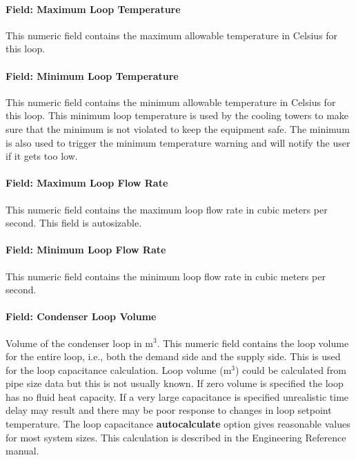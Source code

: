 \paragraph{Field: Maximum Loop Temperature}\label{field-maximum-loop-temperature-1}

This numeric field contains the maximum allowable temperature in Celsius for this loop.

\paragraph{Field: Minimum Loop Temperature}\label{field-minimum-loop-temperature-1}

This numeric field contains the minimum allowable temperature in Celsius for this loop. This minimum loop temperature is used by the cooling towers to make sure that the minimum is not violated to keep the equipment safe. The minimum is also used to trigger the minimum temperature warning and will notify the user if it gets too low.

\paragraph{Field: Maximum Loop Flow Rate}\label{field-maximum-loop-flow-rate-1}

This numeric field contains the maximum loop flow rate in cubic meters per second. This field is autosizable.

\paragraph{Field: Minimum Loop Flow Rate}\label{field-minimum-loop-flow-rate-1}

This numeric field contains the minimum loop flow rate in cubic meters per second.

\paragraph{Field: Condenser Loop Volume}\label{field-condenser-loop-volume}

Volume of the condenser loop in m\(^{3}\). This numeric field contains the loop volume for the entire loop, i.e., both the demand side and the supply side. This is used for the loop capacitance calculation. Loop volume (m\(^{3}\)) could be calculated from pipe size data but this is not usually known. If zero volume is specified the loop has no fluid heat capacity. If a very large capacitance is specified unrealistic time delay may result and there may be poor response to changes in loop setpoint temperature. The loop capacitance \textbf{autocalculate} option gives reasonable values for most system sizes. This calculation is described in the Engineering Reference manual.

